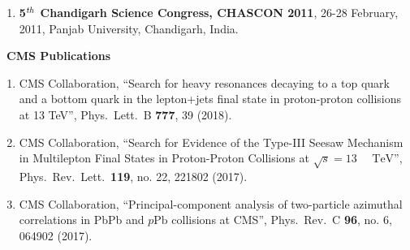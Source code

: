 \begin{itemize}
\begin{enumerate}
\item {\bf 5$^{\it th}$ Chandigarh Science Congress, CHASCON 2011}, 26-28 February, 2011, Panjab University, Chandigarh, India.
\end{enumerate}
\vspace*{3mm}
{\Large \item {\bf ~CMS Publications\protect\footnotemark}}
\begin{enumerate}
\item CMS Collaboration, ``Search for heavy resonances decaying to a top quark and a bottom quark in the lepton+jets final state in proton-proton collisions at 13 TeV'', Phys.\ Lett.\ B {\bf 777}, 39 (2018).

\item CMS Collaboration, ``Search for Evidence of the Type-III Seesaw Mechanism in Multilepton Final States in Proton-Proton Collisions at $\sqrt{s}=13\text{ }\text{ }\mathrm{TeV}$'', Phys.\ Rev.\ Lett.\  {\bf 119}, no. 22, 221802 (2017).

\item CMS Collaboration, ``Principal-component analysis of two-particle azimuthal correlations in PbPb and $p\text{Pb}$ collisions at CMS'', Phys.\ Rev.\ C {\bf 96}, no. 6, 064902 (2017).


\end{enumerate}
\end{itemize}

